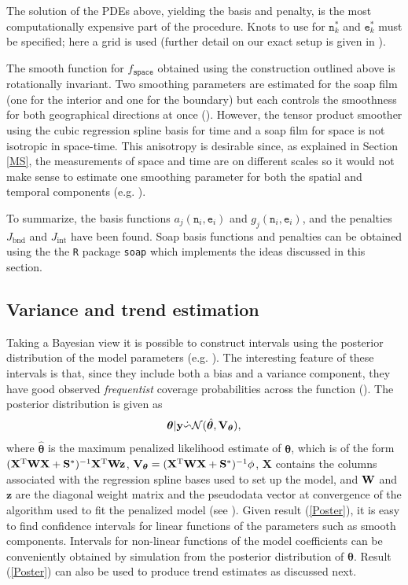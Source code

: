 The solution of the PDEs above, yielding the basis and penalty, is the most computationally expensive part of the procedure. Knots to use for $\texttt{n}_k^*$ and $\texttt{e}_k^*$ must be specified; here a grid is used (further detail on our exact setup is given in ).

The smooth function for $f_\texttt{space}$ obtained using the construction outlined above is rotationally invariant. Two smoothing parameters are estimated for the soap film (one for the interior and one for the boundary) but each controls the smoothness for both geographical directions at once (\cite{soap}). However, the tensor product smoother using the cubic regression spline basis for time and a soap film for space is not isotropic in space-time. This anisotropy is desirable since, as explained in Section \ref{MS}, the measurements of space and time are on different scales so it would not make sense to estimate one smoothing parameter for both the spatial and temporal components (e.g. \cite[p. 162]{simonbook}).
 

To summarize, the basis functions $a_j(\texttt{n}_i,\texttt{e}_i)$ and $g_j(\texttt{n}_i,\texttt{e}_i)$, and the penalties $J_\text{bnd}$ and $J_\text{int}$ have been found. Soap basis functions and penalties can be obtained using the the \texttt{R} package \texttt{soap} which implements the ideas discussed in this section.

\subsection{Variance and trend estimation \label{VE}}

Taking a Bayesian view it is possible to construct intervals using the posterior distribution of the model parameters (e.g. \cite{rwc}). The interesting feature of these intervals is that, since they include both a bias and a variance component, they have good observed \textit{frequentist} coverage probabilities across the function (\cite{Marra2011}). The posterior distribution is given as
\begin{equation}
\bm\theta|{\bf y} \dot{\backsim} \mathcal{N}( \hat{\bm\theta}, {\bf V}_{\bm\theta} ),
\label{Poster}
\end{equation}
where $\hat{\bm\theta}$ is the maximum penalized likelihood estimate of $\bm\theta$, which is of the form $(\mathbf{X}^\text{T}{\bf W}\mathbf{X}+{\bf S}^*)^{-1}\mathbf{X}^\text{T}{\bf W}{\bf z}$, ${\bf V}_{\bm\theta} = (\mathbf{X}^\text{T}{\bf W}\mathbf{X}+{\bf S}^*)^{-1}\phi$, $\mathbf{X}$ contains the columns associated with the regression spline bases used to set up the model, and ${\bf W}$ and $\mathbf{z}$ are the diagonal weight matrix and the pseudodata vector at convergence of the algorithm used to fit the penalized model (see ). Given result (\ref{Poster}), it is easy to find confidence intervals for linear functions of the parameters such as smooth components. Intervals for non-linear functions of the model coefficients can be conveniently obtained by simulation from the posterior distribution of $\bm\theta$. Result (\ref{Poster}) can also be used to produce trend estimates as discussed next.

